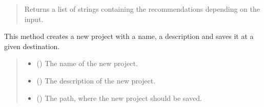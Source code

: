 \documentclass[letterpaper,10pt,english]{sphinxmanual}
\begin{document}
\begin{fulllineitems}
\begin{fulllineitems}
\begin{quote}
\begin{description}
\sphinxAtStartPar
Returns a list of strings containing the recommendations depending on the input.

\sphinxAtStartPar
\sphinxhref{https://docs.python.org/3.11/library/stdtypes.html\#list}{list}{[}\sphinxhref{https://docs.python.org/3.11/library/stdtypes.html\#str}{str}{]}

\end{description}\end{quote}

\end{fulllineitems}


\begin{fulllineitems}
\label{\detokenize{apidoc/src.osm_configurator.model.application:src.osm_configurator.model.application.application_interface.IApplication.create_project}}
\pysigstartsignatures
{}
\pysigstopsignatures
\sphinxAtStartPar
This method creates a new project with a name, a description and saves it at a given destination.
\begin{quote}\begin{description}
\begin{itemize}
\item {} 
\sphinxAtStartPar
{} () \textendash{} The name of the new project.

\item {} 
\sphinxAtStartPar
{} () \textendash{} The description of the new project.

\item {} 
\sphinxAtStartPar
{} () \textendash{} The path, where the new project should be saved.


\end{itemize}
\end{description}
\end{quote}
\end{fulllineitems}
\end{fulllineitems}
\end{document}
